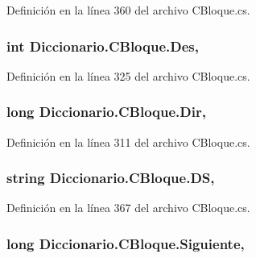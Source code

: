 Definición en la línea 360 del archivo C\-Bloque.\-cs.

\hypertarget{class_diccionario_1_1_c_bloque_a6cdd99921898e009fd3a474728be8290}{
\subsubsection[{Des}]{\setlength{\rightskip}{0pt plus 5cm}int Diccionario.\-C\-Bloque.\-Des\hspace{0.3cm}{\ttfamily [get]}, {\ttfamily [set]}}}\label{class_diccionario_1_1_c_bloque_a6cdd99921898e009fd3a474728be8290}


Definición en la línea 325 del archivo C\-Bloque.\-cs.

\hypertarget{class_diccionario_1_1_c_bloque_a24d659dbd9298a7c8b5d0bfba5885a05}{
\subsubsection[{Dir}]{\setlength{\rightskip}{0pt plus 5cm}long Diccionario.\-C\-Bloque.\-Dir\hspace{0.3cm}{\ttfamily [get]}, {\ttfamily [set]}}}\label{class_diccionario_1_1_c_bloque_a24d659dbd9298a7c8b5d0bfba5885a05}


Definición en la línea 311 del archivo C\-Bloque.\-cs.

\hypertarget{class_diccionario_1_1_c_bloque_a3be51e748e99c5ad61b3c3a547636cce}{
\subsubsection[{D\-S}]{\setlength{\rightskip}{0pt plus 5cm}string Diccionario.\-C\-Bloque.\-D\-S\hspace{0.3cm}{\ttfamily [get]}, {\ttfamily [set]}}}\label{class_diccionario_1_1_c_bloque_a3be51e748e99c5ad61b3c3a547636cce}


Definición en la línea 367 del archivo C\-Bloque.\-cs.

\hypertarget{class_diccionario_1_1_c_bloque_abb8f14727083677dd0a6a060e8879faf}{
\subsubsection[{Siguiente}]{\setlength{\rightskip}{0pt plus 5cm}long Diccionario.\-C\-Bloque.\-Siguiente\hspace{0.3cm}{\ttfamily [get]}, {\ttfamily [set]}}}\label{class_diccionario_1_1_c_bloque_abb8f14727083677dd0a6a060e8879faf}



